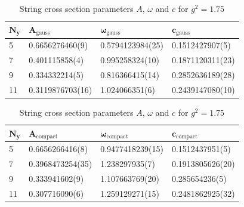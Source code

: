 \begin{table}[!hb]
\centering
\begin{tabular}{llll}
    $\mathbf{N_y}$ & $\mathbf{A_\mathrm{gauss}}$ & $\mathbf{\omega_\mathrm{gauss}}$ & $\mathbf{c_\mathrm{gauss}}$ \\ \hline
   5 & 0.6656276460(9) & 0.5794123984(25) & 0.1512427907(5) \\
   7 & 0.401115858(4) & 0.995258324(10) & 0.1871120311(23) \\
   9 & 0.334332214(5) & 0.816366415(14) & 0.2852636189(28) \\
   11 & 0.3119876703(16) & 1.024066351(6) & 0.2439147080(10) \\
\end{tabular}
\begin{tabular}{llll}
    $\mathbf{N_y}$ & $\mathbf{A_\mathrm{compact}}$ & $\mathbf{\omega_\mathrm{compact}}$ & $\mathbf{c_\mathrm{compact}}$ \\ \hline
   5 & 0.6656266416(8) & 0.9477418239(15) & 0.1512437951(5) \\
   7 & 0.3968473254(35) & 1.238297935(7) & 0.1913805626(20) \\
   9 & 0.333941602(9) & 1.107663769(20) & 0.285654236(5) \\
   11 & 0.307716090(6) & 1.259129271(15) & 0.2481862925(32) \\
\end{tabular}
\caption{String cross section parameters $A$, $\omega$ and $c$ for $g^2=1.75$}
\end{table}
